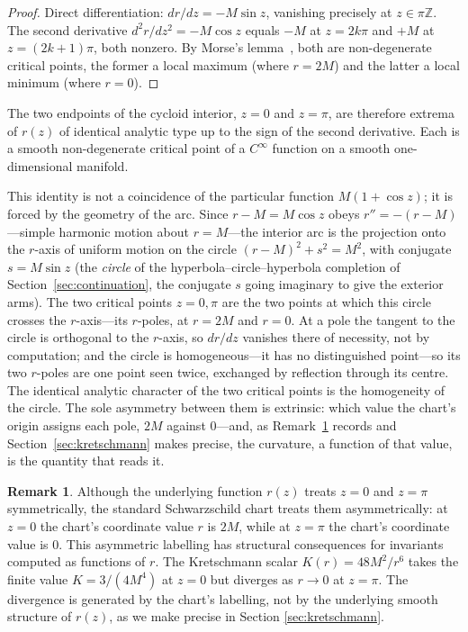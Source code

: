 \documentclass[11pt,a4paper]{article}
\theoremstyle{definition}
\newtheorem{remark}[theorem]{Remark}
\begin{document}
\begin{proof}
Direct differentiation: $dr/dz = -M\sin z$, vanishing precisely at $z \in \pi\mathbb{Z}$. The second derivative $d^2r/dz^2 = -M\cos z$ equals $-M$ at $z = 2k\pi$ and $+M$ at $z = (2k+1)\pi$, both nonzero. By Morse's lemma~\cite{Milnor1963}, both are non-degenerate critical points, the former a local maximum (where $r = 2M$) and the latter a local minimum (where $r=0$).
\end{proof}

The two endpoints of the cycloid interior, $z=0$ and $z=\pi$, are therefore extrema of $r(z)$ of identical analytic type up to the sign of the second derivative. Each is a smooth non-degenerate critical point of a $C^\infty$ function on a smooth one-dimensional manifold.

This identity is not a coincidence of the particular function $M(1+\cos z)$; it is forced by the geometry of the arc. Since $r-M = M\cos z$ obeys $r'' = -(r-M)$---simple harmonic motion about $r=M$---the interior arc is the projection onto the $r$-axis of uniform motion on the circle $(r-M)^2 + s^2 = M^2$, with conjugate $s = M\sin z$ (the \emph{circle} of the hyperbola--circle--hyperbola completion of Section~\ref{sec:continuation}, the conjugate $s$ going imaginary to give the exterior arms). The two critical points $z=0,\pi$ are the two points at which this circle crosses the $r$-axis---its $r$-poles, at $r=2M$ and $r=0$. At a pole the tangent to the circle is orthogonal to the $r$-axis, so $dr/dz$ vanishes there of necessity, not by computation; and the circle is homogeneous---it has no distinguished point---so its two $r$-poles are one point seen twice, exchanged by reflection through its centre. The identical analytic character of the two critical points is the homogeneity of the circle. The sole asymmetry between them is extrinsic: which value the chart's origin assigns each pole, $2M$ against $0$---and, as Remark~\ref{rem:asymmetric_chart} records and Section~\ref{sec:kretschmann} makes precise, the curvature, a function of that value, is the quantity that reads it.

\begin{remark}\label{rem:asymmetric_chart}
Although the underlying function $r(z)$ treats $z=0$ and $z=\pi$ symmetrically, the standard Schwarzschild chart treats them asymmetrically: at $z=0$ the chart's coordinate value $r$ is $2M$, while at $z=\pi$ the chart's coordinate value is $0$. This asymmetric labelling has structural consequences for invariants computed as functions of $r$. The Kretschmann scalar $K(r) = 48M^2/r^6$ takes the finite value $K = 3/(4M^4)$ at $z=0$ but diverges as $r \to 0$ at $z=\pi$. The divergence is generated by the chart's labelling, not by the underlying smooth structure of $r(z)$, as we make precise in Section \ref{sec:kretschmann}.
\end{remark}
\end{document}
